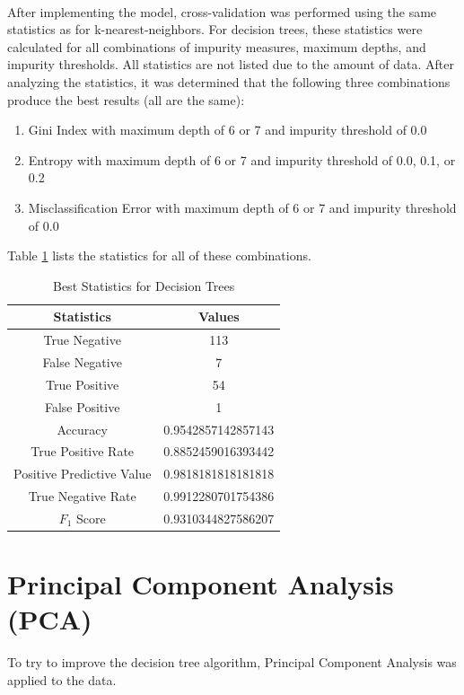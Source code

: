 \documentclass[12pt]{article}
\begin{document}
    \paragraph{}
    After implementing the model, cross-validation was performed using the same statistics as for  k-nearest-neighbors. For decision trees, these statistics were calculated for all combinations of impurity measures, maximum depths, and impurity thresholds. All statistics are not listed due to the amount of data. After analyzing the statistics, it was determined that the following three combinations produce the best results (all are the same):
    \begin{enumerate}
    	\item Gini Index with maximum depth of 6 or 7 and impurity threshold of 0.0
    	\item Entropy with maximum depth of 6 or 7 and impurity threshold of 0.0, 0.1, or 0.2
    	\item Misclassification Error with maximum depth of 6 or 7 and impurity threshold of 0.0
    \end{enumerate}
    Table \ref{dtstats} lists the statistics for all of these combinations.
    \begin{table}[]
    	\centering
    	\begin{tabular}{|c | c|}
    		\hline
    		Statistics & Values\\ \hline
    	    True Negative & 113 \\
    	    False Negative & 7 \\
    	    True Positive & 54 \\
    	    False Positive & 1 \\
    	    Accuracy & 0.9542857142857143 \\
    	    True Positive Rate & 0.8852459016393442 \\
    	    Positive Predictive Value & 0.9818181818181818 \\
    	    True Negative Rate & 0.9912280701754386 \\
    	    $F_1$ Score & 0.9310344827586207 \\ \hline
        \end{tabular}
        \caption{Best Statistics for Decision Trees}\label{dtstats}
    \end{table}

    \section{Principal Component Analysis (PCA)}
    To try to improve the decision tree algorithm, Principal Component Analysis was applied to the data.
\end{document}
